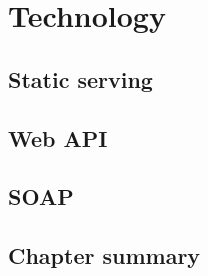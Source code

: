 \chapter{Technology}
\label{chap:Technology}

\section{Static serving}
\label{sec:Static serving}

\section{Web API}
\label{sec:Web API}

\section{SOAP}
\label{sec:SOAP}


\section{Chapter summary}
\label{sec:Chapter summary}
